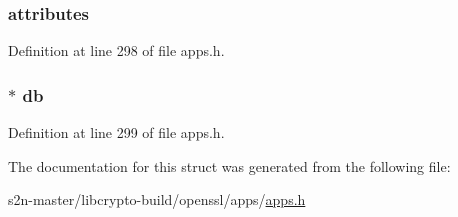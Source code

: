 \subsubsection[{\texorpdfstring{attributes}{attributes}}]{ attributes}\hypertarget{structca__db__st_a85257425ad5ab28909d20fd1cf5120bd}{}\label{structca__db__st_a85257425ad5ab28909d20fd1cf5120bd}


Definition at line 298 of file apps.\+h.

\subsubsection[{\texorpdfstring{db}{db}}]{$\ast$ db}\hypertarget{structca__db__st_aba4108833d21b1fe365d101f9c9afc3c}{}\label{structca__db__st_aba4108833d21b1fe365d101f9c9afc3c}


Definition at line 299 of file apps.\+h.



The documentation for this struct was generated from the following file\+:\begin{DoxyCompactItemize}
\item 
s2n-\/master/libcrypto-\/build/openssl/apps/\hyperlink{apps_8h}{apps.\+h}\end{DoxyCompactItemize}
